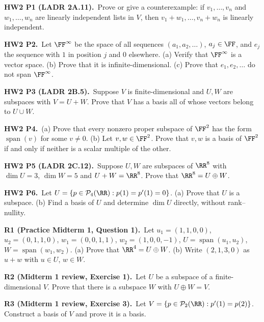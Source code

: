 \documentclass[10pt]{scrartcl}
\DeclareMathOperator{\spn}{span}
\newcommand{\PP}{\mathcal P}
\begin{document}
\begin{prob}\textbf{HW2 P1 (LADR 2A.11).}\ Prove or give a counterexample: if $v_1,\dots,v_n$ and $w_1,\dots,w_n$ are linearly independent lists in $V$, then $v_1+w_1,\dots,v_n+w_n$ is linearly independent.


\end{prob}
\begin{prob}\textbf{HW2 P2.}\ Let $\FF^\infty$ be the space of all sequences $(a_1,a_2,\dots)$, $a_j\in\FF$, and $e_j$ the sequence with $1$ in position $j$ and $0$ elsewhere. (a) Verify that $\FF^\infty$ is a vector space. (b) Prove that it is infinite-dimensional. (c) Prove that $e_1,e_2,\dots$ do not span $\FF^\infty$.


\end{prob}
\begin{prob}\textbf{HW2 P3 (LADR 2B.5).}\ Suppose $V$ is finite-dimensional and $U,W$ are subspaces with $V=U+W$. Prove that $V$ has a basis all of whose vectors belong to $U\cup W$.


\end{prob}
\begin{prob}\textbf{HW2 P4.}\ (a) Prove that every nonzero proper subspace of $\FF^2$ has the form $\spn(v)$ for some $v\ne0$. (b) Let $v,w\in\FF^2$. Prove that $v,w$ is a basis of $\FF^2$ if and only if neither is a scalar multiple of the other.


\end{prob}
\begin{prob}\textbf{HW2 P5 (LADR 2C.12).}\ Suppose $U,W$ are subspaces of $\RR^8$ with $\dim U=3$, $\dim W=5$ and $U+W=\RR^8$. Prove that $\RR^8=U\oplus W$.


\end{prob}
\begin{prob}\textbf{HW2 P6.}\ Let $U=\{p\in\PP_4(\RR):p(1)=p'(1)=0\}$. (a) Prove that $U$ is a subspace. (b) Find a basis of $U$ and determine $\dim U$ directly, without rank--nullity.


\end{prob}
\begin{prob}\textbf{R1 (Practice Midterm 1, Question 1).}\ Let $u_1=(1,1,0,0)$, $u_2=(0,1,1,0)$, $w_1=(0,0,1,1)$, $w_2=(1,0,0,-1)$, $U=\spn(u_1,u_2)$, $W=\spn(w_1,w_2)$. (a) Prove that $\RR^4=U\oplus W$. (b) Write $(2,1,3,0)$ as $u+w$ with $u\in U$, $w\in W$.
\end{prob}
\begin{prob}\textbf{R2 (Midterm 1 review, Exercise 1).}\ Let $U$ be a subspace of a finite-dimensional $V$. Prove that there is a subspace $W$ with $U\oplus W=V$.
\end{prob}
\begin{prob}\textbf{R3 (Midterm 1 review, Exercise 3).}\ Let $V=\{p\in\PP_2(\RR):p'(1)=p(2)\}$. Construct a basis of $V$ and prove it is a basis.
\end{prob}
\end{document}
